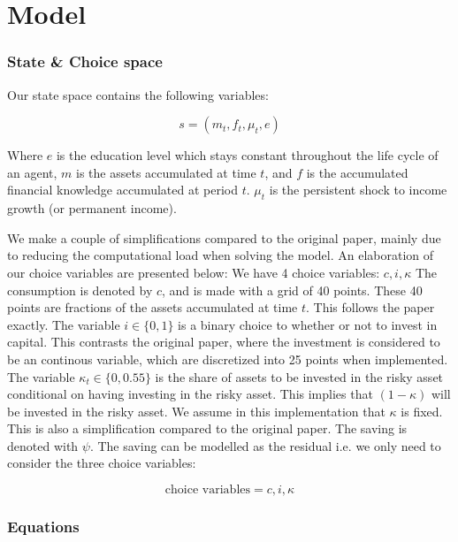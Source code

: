 \section{Model}

\subsubsection{State \& Choice space}\label{sec:stateandchoicespace}
Our state space contains the following variables:

\begin{equation}
    s = (m_t, f_t, \mu_t, e)
\end{equation}

Where $e$ is the education level which stays constant throughout the life cycle of an agent, $m$ is the assets accumulated at time $t$, and $f$ is the accumulated financial knowledge accumulated at period $t$. $\mu_t$ is the persistent shock to income growth (or permanent income).

We make a couple of simplifications compared to the original paper, mainly due to reducing the computational load when solving the model. An elaboration of our choice variables are presented below:
We have 4 choice variables: $ c, i, \kappa$ The consumption is denoted by $c$, and is made with a grid of 40 points. These 40 points are fractions of the assets accumulated at time $t$. This follows the paper exactly. The variable $i \in \{0, 1\}$ is a binary choice to whether or not to invest in capital. This contrasts the original paper, where the investment is considered to be an continous variable, which are discretized into 25 points when implemented. The variable $\kappa_t \in \{0 , 0.55\}$ is the share of assets to be invested in the risky asset conditional on having investing in the risky asset. This implies that $(1 - \kappa)$ will be invested in the risky asset. We assume in this implementation that $\kappa$ is fixed. This is also a simplification compared to the original paper. The saving is denoted with $\psi$. The saving can be modelled as the residual i.e. we only need to consider the three choice variables:

\begin{equation}
    \text{choice variables} = c, i, \kappa
\end{equation}

\subsubsection{Equations}

